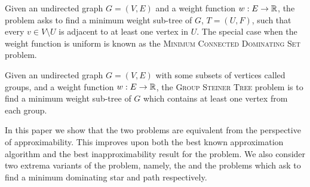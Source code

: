 Given an undirected graph $G = (V, E)$ and a weight function $w:E \to \mathbb{R}$, 
the \Problem{} problem asks to find a minimum weight sub-tree of $G$, 
$T = (U, F)$, such that every $v \in V \setminus U$ is adjacent to at least one 
vertex in $U$.
The special case when the weight function is uniform is known as the 
\textsc{Minimum Connected Dominating Set} problem.

Given an undirected graph $G = (V, E)$ with some subsets of vertices called groups,
and a weight function $w:E \to \mathbb{R}$,
the \textsc{Group Steiner Tree} problem is to find a minimum weight sub-tree
of $G$ which contains at least one vertex from each group. 

In this paper we show that the two problems are equivalent
from the perspective of approximability.
This improves upon both the best known approximation algorithm and the best 
inapproximability result for the \Problem{} problem.
We also consider two extrema variants of the \Problem{} problem, namely,
the \ProblemStar{} and the \ProblemPath{} problems 
which ask to find a minimum dominating star and path respectively.  

